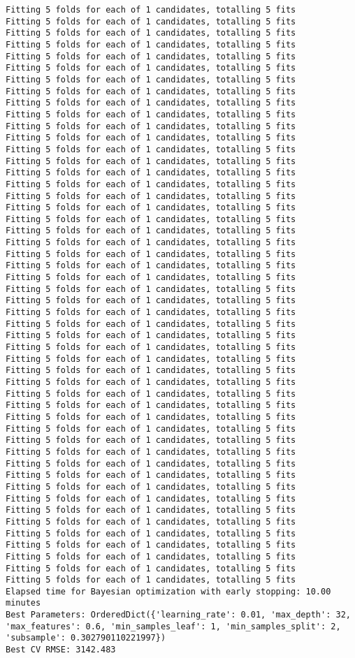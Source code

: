 \documentclass[
  letterpaper,
  DIV=11,
  numbers=noendperiod]{scrreprt}
\begin{document}
\begin{verbatim}
Fitting 5 folds for each of 1 candidates, totalling 5 fits
Fitting 5 folds for each of 1 candidates, totalling 5 fits
Fitting 5 folds for each of 1 candidates, totalling 5 fits
Fitting 5 folds for each of 1 candidates, totalling 5 fits
Fitting 5 folds for each of 1 candidates, totalling 5 fits
Fitting 5 folds for each of 1 candidates, totalling 5 fits
Fitting 5 folds for each of 1 candidates, totalling 5 fits
Fitting 5 folds for each of 1 candidates, totalling 5 fits
Fitting 5 folds for each of 1 candidates, totalling 5 fits
Fitting 5 folds for each of 1 candidates, totalling 5 fits
Fitting 5 folds for each of 1 candidates, totalling 5 fits
Fitting 5 folds for each of 1 candidates, totalling 5 fits
Fitting 5 folds for each of 1 candidates, totalling 5 fits
Fitting 5 folds for each of 1 candidates, totalling 5 fits
Fitting 5 folds for each of 1 candidates, totalling 5 fits
Fitting 5 folds for each of 1 candidates, totalling 5 fits
Fitting 5 folds for each of 1 candidates, totalling 5 fits
Fitting 5 folds for each of 1 candidates, totalling 5 fits
Fitting 5 folds for each of 1 candidates, totalling 5 fits
Fitting 5 folds for each of 1 candidates, totalling 5 fits
Fitting 5 folds for each of 1 candidates, totalling 5 fits
Fitting 5 folds for each of 1 candidates, totalling 5 fits
Fitting 5 folds for each of 1 candidates, totalling 5 fits
Fitting 5 folds for each of 1 candidates, totalling 5 fits
Fitting 5 folds for each of 1 candidates, totalling 5 fits
Fitting 5 folds for each of 1 candidates, totalling 5 fits
Fitting 5 folds for each of 1 candidates, totalling 5 fits
Fitting 5 folds for each of 1 candidates, totalling 5 fits
Fitting 5 folds for each of 1 candidates, totalling 5 fits
Fitting 5 folds for each of 1 candidates, totalling 5 fits
Fitting 5 folds for each of 1 candidates, totalling 5 fits
Fitting 5 folds for each of 1 candidates, totalling 5 fits
Fitting 5 folds for each of 1 candidates, totalling 5 fits
Fitting 5 folds for each of 1 candidates, totalling 5 fits
Fitting 5 folds for each of 1 candidates, totalling 5 fits
Fitting 5 folds for each of 1 candidates, totalling 5 fits
Fitting 5 folds for each of 1 candidates, totalling 5 fits
Fitting 5 folds for each of 1 candidates, totalling 5 fits
Fitting 5 folds for each of 1 candidates, totalling 5 fits
Fitting 5 folds for each of 1 candidates, totalling 5 fits
Fitting 5 folds for each of 1 candidates, totalling 5 fits
Fitting 5 folds for each of 1 candidates, totalling 5 fits
Fitting 5 folds for each of 1 candidates, totalling 5 fits
Fitting 5 folds for each of 1 candidates, totalling 5 fits
Fitting 5 folds for each of 1 candidates, totalling 5 fits
Fitting 5 folds for each of 1 candidates, totalling 5 fits
Fitting 5 folds for each of 1 candidates, totalling 5 fits
Fitting 5 folds for each of 1 candidates, totalling 5 fits
Fitting 5 folds for each of 1 candidates, totalling 5 fits
Fitting 5 folds for each of 1 candidates, totalling 5 fits
Elapsed time for Bayesian optimization with early stopping: 10.00 minutes
Best Parameters: OrderedDict({'learning_rate': 0.01, 'max_depth': 32, 'max_features': 0.6, 'min_samples_leaf': 1, 'min_samples_split': 2, 'subsample': 0.302790110221997})
Best CV RMSE: 3142.483
\end{verbatim}
\end{document}
